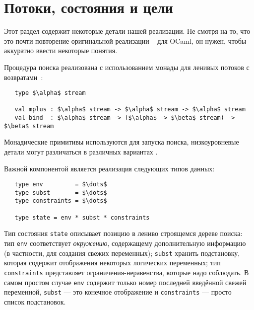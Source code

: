 
\section{Потоки, состояния и цели}
\label{sec:goals}

Этот раздел содержит некоторые детали нашей реализации.
Не смотря на то, что это почти повторение оригинальной реализации ~\cite{MicroKanren, CKanren} для OCaml, он нужен, чтобы аккуратно ввести некоторые понятия.

Процедура поиска реализована с использованием монады для ленивых потоков с возвратами~\cite{KiselyovBacktracking}:

\begin{lstlisting}
   type $\alpha$ stream

   val mplus : $\alpha$ stream -> $\alpha$ stream -> $\alpha$ stream
   val bind  : $\alpha$ stream -> ($\alpha$ -> $\beta$ stream) -> $\beta$ stream
\end{lstlisting}

\noindent Монадические примитивы используются для запуска поиска, низкоуровневые детали могут различаться в  различных вариантах \miniKanren.

Важной компонентой является реализация следующих типов данных:

\begin{lstlisting}
   type env         = $\dots$
   type subst       = $\dots$
   type constraints = $\dots$

   type state = env * subst * constraints
\end{lstlisting}
Тип состояния \lstinline|state| описывает позицию в лениво строящемся дереве поиска:
тип \lstinline|env| соответствует  \emph{окружению}, содержащему дополнительную информацию (в частности, для создания свежих переменных);
\lstinline|subst| хранить подстановку, которая содержит отображения некоторых логических переменных;
тип \lstinline|constraints| представляет ограничения-неравенства, которые надо соблюдать.
В самом простом случае \lstinline|env| содержит только номер последней введённой свежей переменной, \lstinline|subst| --- это конечное отображение и \lstinline|constraints| --- просто список подстановок.

